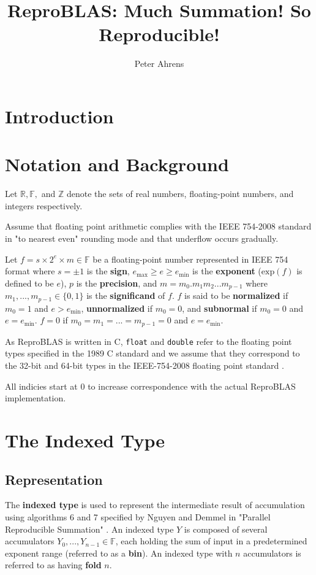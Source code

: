 \documentclass[12pt]{article}
\author{Peter Ahrens}
\title{ReproBLAS: Much Summation! So Reproducible!}
\providecommand{\R}{\ensuremath{\mathbb{R}}}
\providecommand{\F}{\ensuremath{\mathbb{F}}}
\providecommand{\Z}{\ensuremath{\mathbb{Z}}}
\providecommand{\exp}{\ensuremath{\text{exp}}}
\providecommand{\min}{\ensuremath{\text{min}}}
\providecommand{\max}{\ensuremath{\text{max}}}
\theoremstyle{plain}
\begin{document}
\noindent
\maketitle
\newpage
\section{Introduction}

\section{Notation and Background}
  Let $\R, \F, $ and $\Z$ denote the sets of real numbers, floating-point numbers, and integers respectively.

  Assume that floating point arithmetic complies with the IEEE 754-2008 standard in "to nearest even" rounding mode and that underflow occurs gradually.

  Let $f = s \times 2^e \times m \in \F$ be a floating-point number represented in IEEE 754 format where $s = \pm 1$ is the \textbf{sign}, $e_{\max} \geq e \geq e_{\min}$ is the \textbf{exponent} ($\exp(f)$ is defined to be $e$), $p$ is the \textbf{precision}, and $m = m_0.m_1m_2...m_{p-1}$ where $m_1, ..., m_{p - 1} \in \{0, 1\}$ is the \textbf{significand} of $f$. $f$ is said to be \textbf{normalized} if $m_0 = 1$ and $e > e_{\min}$, \textbf{unnormalized} if $m_0 = 0$, and \textbf{subnormal} if $m_0 = 0$ and $e = e_{\min}$. $f = 0$ if $m_0 = m_1 = ... = m_{p - 1} = 0$ and $e = e_{\min}$.

  As ReproBLAS is written in C, \verb|float| and \verb|double| refer to the floating point types specified in the 1989 C standard \cite{c89} and we assume that they correspond to the 32-bit and 64-bit types in the IEEE-754-2008 floating point standard \cite{ieee754}. 

  All indicies start at 0 to increase correspondence with the actual ReproBLAS implementation.

\section{The Indexed Type}
  \subsection{Representation}
    The \textbf{indexed type} is used to represent the intermediate result of accumulation using algorithms 6 and 7 specified by Nguyen and Demmel in "Parallel Reproducible Summation" \cite{repsum}.
    An indexed type $Y$ is composed of several accumulators $Y_0, ..., Y_{n - 1} \in \F$, each holding the sum of input in a predetermined exponent range (referred to as a \textbf{bin}). An indexed type with $n$ accumulators is referred to as having \textbf{fold} $n$.
\end{document}
